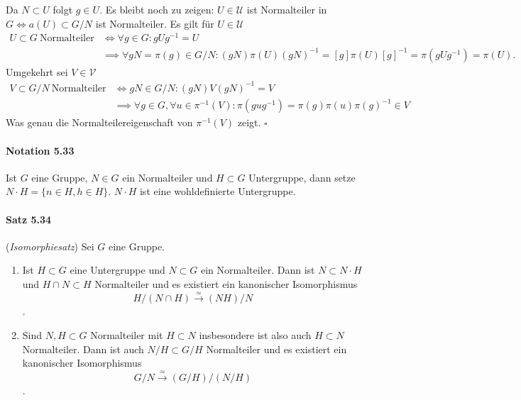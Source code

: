 \documentclass{scrartcl}
\begin{document}
Da $N \subset U$ folgt $g \in U$.
Es bleibt noch zu zeigen: $U \in \mathcal{U}$ ist Normalteiler in $G \Leftrightarrow a(U)
\subset G/N$ ist Normalteiler. Es gilt für $U \in \mathcal{U}$
\begin{align*}
  U \subset G~\text{Normalteiler} &\iff \forall g \in G: gUg^{-1} = U \\
                                  &\implies \forall gN = \pi(g) \in G/N: (gN)\pi(U)(gN)^{-1}
                                    = [g]\pi(U)[g]^{-1} =\pi(gUg^{-1}) = \pi(U).
\end{align*}
Umgekehrt sei $V \in \mathcal{V}$
\begin{align*}
  V \subset G/N~\text{Normalteiler} &\iff gN \in G/N: (gN)V(gN)^{-1} = V \\
                                    &\implies \forall g \in G, \forall u \in \pi^{-1}(V):
                                      \pi(gug^{-1}) = \pi(g)\pi(u)\pi(g)^{-1} \in V
\end{align*}
Was genau die Normalteilereigenschaft von $\pi^{-1}(V)$ zeigt.
\hfill $\square$

\paragraph{Notation 5.33} Ist $G$ eine Gruppe, $N \in G$ ein Normalteiler und $H
\subset G$ Untergruppe, dann setze $N \cdot H = \{n \in H, h \in H\}$. $N \cdot
H$ ist eine wohldefinierte Untergruppe.

\paragraph{Satz 5.34} (\textit{Isomorphiesatz}) Sei $G$ eine Gruppe.
\begin{enumerate}
\item Ist $H \subset G$ eine Untergruppe und $N \subset G$ ein Normalteiler.
  Dann ist $N \subset N \cdot H$ und $H \cap N \subset H$ Normalteiler und es
  existiert ein kanonischer Isomorphismus
  \[
    H/(N \cap H) \overset{\simeq}{\to} (NH)/N
  \]
  .
\item Sind $N, H \subset G$ Normalteiler mit $H \subset N$ insbesondere ist also
  auch $H \subset N$ Normalteiler. Dann ist auch $N/H \subset G/H$ Normalteiler
  und es existiert ein kanonischer Isomorphismus
  \[
    G/N \overset{\simeq}{\to}(G/H)/(N/H)
  \]
  .
\end{enumerate}
\end{document}
